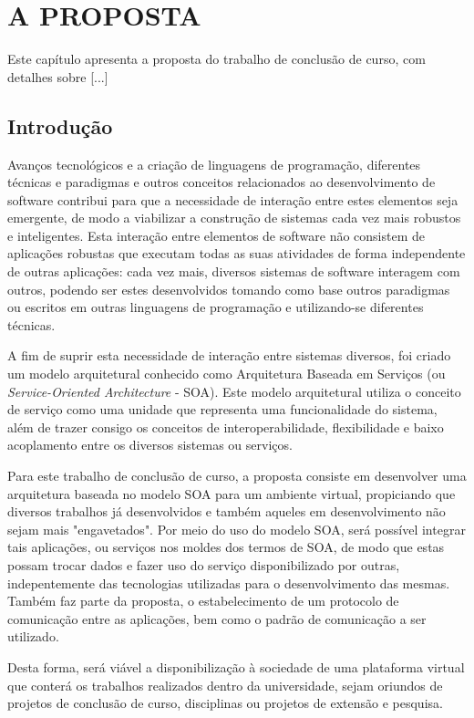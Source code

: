 \chapter[A PROPOSTA]{A PROPOSTA}

Este capítulo apresenta a proposta do trabalho de conclusão de curso, com detalhes sobre [...]

\section{Introdução}
Avanços tecnológicos e a criação de linguagens de programação, diferentes técnicas e paradigmas e outros conceitos relacionados ao desenvolvimento de software contribui para que a necessidade de interação entre estes elementos seja emergente, de modo a viabilizar a construção de sistemas cada vez mais robustos e inteligentes. Esta interação entre elementos de software não consistem de aplicações robustas que executam todas as suas atividades de forma independente de outras aplicações: cada vez mais, diversos sistemas de software interagem com outros, podendo ser estes desenvolvidos tomando como base outros paradigmas ou escritos em outras linguagens de programação e utilizando-se diferentes técnicas.

A fim de suprir esta necessidade de interação entre sistemas diversos, foi criado um modelo arquitetural conhecido como Arquitetura Baseada em Serviços (ou \textit{Service-Oriented Architecture} - SOA). Este modelo arquitetural utiliza o conceito de serviço como uma unidade que representa uma funcionalidade do sistema, além de trazer consigo os conceitos de interoperabilidade, flexibilidade e baixo acoplamento entre os diversos sistemas ou serviços.

Para este trabalho de conclusão de curso, a proposta consiste em desenvolver uma arquitetura baseada no modelo SOA para um ambiente virtual, propiciando que diversos trabalhos já desenvolvidos e também aqueles em desenvolvimento não sejam mais "engavetados". Por meio do uso do modelo SOA, será possível integrar tais aplicações, ou serviços nos moldes dos termos de SOA, de modo que estas possam trocar dados e fazer uso do serviço disponibilizado por outras, indepentemente das tecnologias utilizadas para o desenvolvimento das mesmas. Também faz parte da proposta, o estabelecimento de um protocolo de comunicação entre as aplicações, bem como o padrão de comunicação a ser utilizado.

Desta forma, será viável a disponibilização à sociedade de uma plataforma virtual que conterá os trabalhos realizados dentro da universidade, sejam oriundos de projetos de conclusão de curso, disciplinas ou projetos de extensão e pesquisa.

